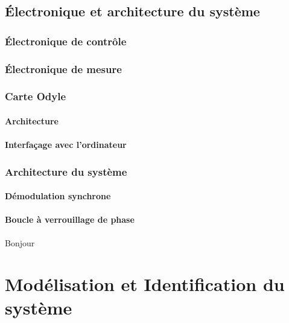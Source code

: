 \section{\'Electronique et architecture du système}

\subsection{\'Electronique de contrôle}

\subsection{\'Electronique de mesure}

\subsection{Carte Odyle}
\subsubsection{Architecture}
\subsubsection{Interfaçage avec l'ordinateur}

\subsection{Architecture du système}
\subsubsection{Démodulation synchrone}
\subsubsection{Boucle à verrouillage de phase}

Bonjour~\cite{Amendola2017}


\cleardoublepage{}
\chapter{Modélisation et Identification du système}


